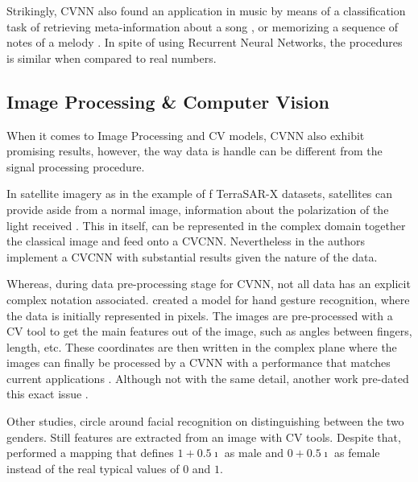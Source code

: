 Strikingly, \gls{CVNN} also found an application in music by means of a classification task of retrieving meta-information about a song \parencite{kataoka1998music}, or memorizing a sequence of notes of a melody \parencite{kinouchi1996memorization}. In spite of \parencite{kataoka1998music} using Recurrent Neural Networks, the procedures is similar when compared to real numbers.

\subsection{Image Processing \& Computer Vision}

When it comes to Image Processing and \gls{CV} models, \gls{CVNN} also exhibit promising results, however, the way  data is handle can be different from the signal processing procedure.

In satellite imagery as in the example of f TerraSAR-X datasets, satellites can provide aside from a normal image, information about the polarization of the light received \parencite{gleich2018complex}. This in itself, can be represented in the complex domain together the classical image and feed onto a \gls{CVCNN}. Nevertheless in \parencite{gleich2018complex} the authors implement a \gls{CVCNN} with substantial results given the nature of the data.

Whereas, during data pre-processing stage for \gls{CVNN}, not all data has an explicit complex notation associated. \textcite{liu2014handgestures} created a model for hand gesture recognition, where the data is initially represented in pixels. The images are pre-processed with a \gls{CV} tool to get the main features out of the image, such as angles between fingers, length, etc. These coordinates are then written in the complex plane where the images can finally be processed by a \gls{CVNN} with a performance that matches current applications \parencite{liu2014handgestures}. Although not with the same detail, another work pre-dated this exact issue \parencite{hafiz2011handgesturecvnn}.

Other studies, circle around facial recognition on distinguishing between the two genders. Still features are extracted from an image with \gls{CV} tools. Despite that, \textcite{amilia2015face} performed a mapping that defines $ 1 + 0.5\imath $ as male and $ 0 + 0.5\imath $ as female instead of the real typical values of $0$ and $1$.


